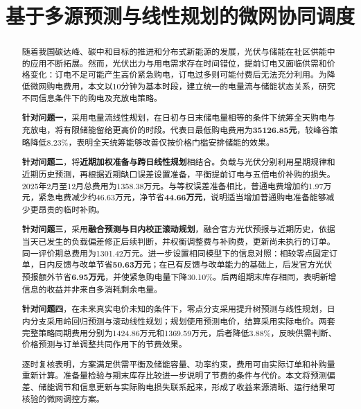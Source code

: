 \title{基于多源预测与线性规划的微网协同调度}
\date{}
\maketitle
\begingroup
{}
\begin{abstract}
\noindent\hspace*{2em}随着我国碳达峰、碳中和目标的推进和分布式新能源的发展，光伏与储能在社区供能中的应用不断拓展。然而，光伏出力与用电需求存在时间错位，提前订电又面临供需和价格变化：订电不足可能产生高价紧急购电，订电过多则可能付费后无法充分利用。为降低微网购电费用，本文以10分钟为基本时段，建立统一的电量流与储能状态关系，研究不同信息条件下的购电及充放电策略。

\textbf{针对问题一}，采用电量流线性规划，在日初与日末储电量相等的条件下统筹全天购电与充放电，将有限储能留给更高价的时段。代表日最低购电费用为\textbf{35126.85元}，较峰谷策略降低8.23\%，表明全天统筹能够改善仅按价格门槛安排储能的效果。

\textbf{针对问题二}，将\textbf{近期加权准备与跨日线性规划}相结合。负载与光伏分别利用星期规律和近期历史预测，再根据近期缺口误差设置准备，平衡提前订电与五倍电价补购的损失。2025年2月至12月总费用为1358.38万元。与等权误差准备相比，普通电费增加约1.97万元，紧急电费减少约46.63万元，净节省\textbf{44.66万元}，说明适当增加普通购电准备能够减少更昂贵的临时补购。

\textbf{针对问题三}，采用\textbf{融合预测与日内校正滚动规划}，融合官方光伏预报与近期历史，依据当天已发生的负载偏差修正后续判断，并权衡调整费与补购费，更新尚未执行的订单。同一评价期总费用为1301.42万元。进一步设置相同模型下的信息对照：相较零点固定订单，日内反馈与改单节省\textbf{50.63万元}；在已有反馈与改单能力的基础上，后发官方光伏预报额外节省\textbf{6.95万元}，并使紧急购电量下降30.10\%。后两组期末库存相同，表明新增信息的收益并非来自多消耗剩余电量。

\textbf{针对问题四}，在未来真实电价未知的条件下，零点分支采用提升树预测与线性规划，日内分支采用岭回归预测与滚动线性规划；规划使用预测电价，结算采用实际电价。两套完整策略同期费用分别为1424.86万元和1369.59万元，后者降低3.88\%，反映供需判断、价格预测与订单调整共同作用下的节费效果。

逐时复核表明，方案满足供需平衡及储能容量、功率约束，费用可由实际订单和补购量重新计算。准备量检验与期末库存比较进一步说明了节费的条件与代价。本文将预测偏差、储能调节和信息更新与实际购电损失联系起来，形成了收益来源清晰、运行结果可核验的微网调控方案。
\end{abstract}
\par
\endgroup
